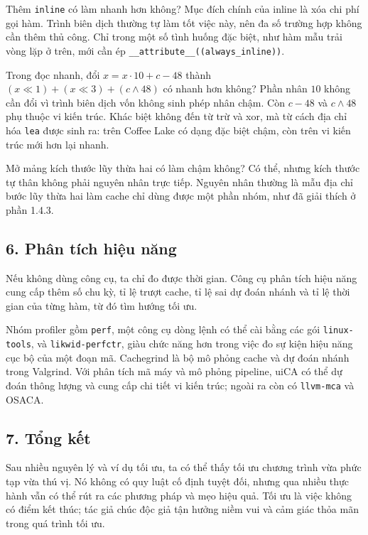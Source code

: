 \documentclass[11pt]{article}
\begin{document}
Thêm \texttt{inline} có làm nhanh hơn không? Mục đích chính của inline là xóa
chi phí gọi hàm. Trình biên dịch thường tự làm tốt việc này, nên đa số trường
hợp không cần thêm thủ công. Chỉ trong một số tình huống đặc biệt, như hàm mẫu
trải vòng lặp ở trên, mới cần ép \texttt{\_\_attribute\_\_((always\_inline))}.

Trong đọc nhanh, đổi \(x=x\cdot10+c-48\) thành
\((x\ll1)+(x\ll3)+(c\mathbin{\wedge}48)\) có nhanh hơn không? Phần nhân \(10\)
không cần đổi vì trình biên dịch vốn không sinh phép nhân chậm. Còn \(c-48\)
và \(c\mathbin{\wedge}48\) phụ thuộc vi kiến trúc. Khác biệt không đến từ trừ
và xor, mà từ cách địa chỉ hóa \texttt{lea} được sinh ra: trên Coffee Lake có
dạng đặc biệt chậm, còn trên vi kiến trúc mới hơn lại nhanh.

Mở mảng kích thước lũy thừa hai có làm chậm không? Có thể, nhưng kích thước tự
thân không phải nguyên nhân trực tiếp. Nguyên nhân thường là mẫu địa chỉ bước
lũy thừa hai làm cache chỉ dùng được một phần nhóm, như đã giải thích ở phần
1.4.3.

\subsection*{6. Phân tích hiệu năng}

Nếu không dùng công cụ, ta chỉ đo được thời gian. Công cụ phân tích hiệu năng
cung cấp thêm số chu kỳ, tỉ lệ trượt cache, tỉ lệ sai dự đoán nhánh và tỉ lệ
thời gian của từng hàm, từ đó tìm hướng tối ưu.

Nhóm profiler gồm \texttt{perf}, một công cụ dòng lệnh có thể cài bằng các gói
\texttt{linux-tools}, và \texttt{likwid-perfctr}, giàu chức năng hơn trong việc
đo sự kiện hiệu năng cục bộ của một đoạn mã. Cachegrind là bộ mô phỏng cache và
dự đoán nhánh trong Valgrind. Với phân tích mã máy và mô phỏng pipeline, uiCA
có thể dự đoán thông lượng và cung cấp chi tiết vi kiến trúc; ngoài ra còn có
\texttt{llvm-mca} và OSACA.

\subsection*{7. Tổng kết}

Sau nhiều nguyên lý và ví dụ tối ưu, ta có thể thấy tối ưu chương trình vừa
phức tạp vừa thú vị. Nó không có quy luật cố định tuyệt đối, nhưng qua nhiều
thực hành vẫn có thể rút ra các phương pháp và mẹo hiệu quả. Tối ưu là việc
không có điểm kết thúc; tác giả chúc độc giả tận hưởng niềm vui và cảm giác
thỏa mãn trong quá trình tối ưu.
\end{document}
